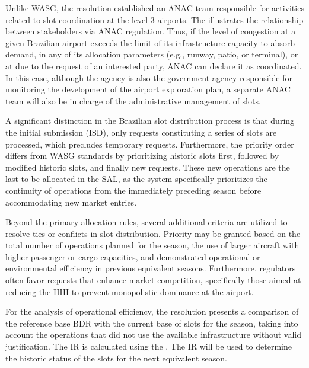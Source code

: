 %



Unlike \acrshort{WASG}, the resolution established an \acrshort{ANAC} team
responsible for activities related to slot coordination at the level 3 airports.
%
The  illustrates the relationship between
stakeholders via \acrshort{ANAC} regulation.
%
Thus, if the level of congestion at a given Brazilian airport exceeds the limit
of its infrastructure capacity to absorb demand, in any of its allocation
parameters (e.g., runway, patio, or terminal), or at due to the request of an
interested party, \acrshort{ANAC} can declare it as coordinated.
%
In this case, although the agency is also the government agency responsible for
monitoring the development of the airport exploration plan, a separate
\acrshort{ANAC} team will also be in charge of the administrative management of
slots.



A significant distinction in the Brazilian slot distribution process is that
during the initial submission (\acrshort{ISD}), only requests constituting a
series of slots are processed, which precludes temporary requests.
%
Furthermore, the priority order differs from \acrshort{WASG} standards by
prioritizing historic slots first, followed by modified historic slots, and
finally new requests.
%
These new operations are the last to be allocated in the \acrshort{SAL}, as the
system specifically prioritizes the continuity of operations from the
immediately preceding season before accommodating new market entries.



Beyond the primary allocation rules, several additional criteria are utilized to
resolve ties or conflicts in slot distribution.
%
Priority may be granted based on the total number of operations planned for the
season, the use of larger aircraft with higher passenger or cargo capacities,
and demonstrated operational or environmental efficiency in previous equivalent
seasons.
%
Furthermore, regulators often favor requests that enhance market competition,
specifically those aimed at reducing the \acrfull{HHI} to prevent monopolistic
dominance at the airport.



For the analysis of operational efficiency, the resolution presents a comparison
of the reference base \acrshort{BDR} with the current base of slots for the
season, taking into account the operations that did not use the available
infrastructure without valid justification.
%
The \acrfull{IR} is calculated using the .
%
The \acrshort{IR} will be used to determine the historic status of the slots for
the next equivalent season.
%



